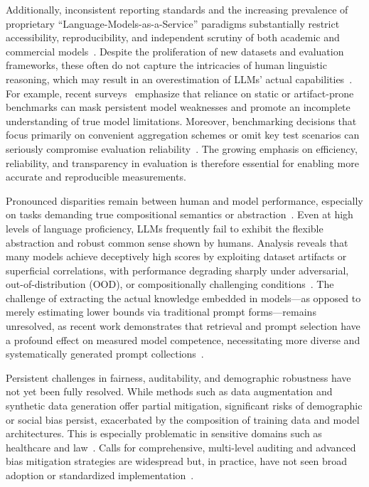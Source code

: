 \documentclass[sigconf]{acmart}
\begin{document}
Additionally, inconsistent reporting standards and the increasing prevalence of proprietary ``Language-Models-as-a-Service'' paradigms substantially restrict accessibility, reproducibility, and independent scrutiny of both academic and commercial models~\cite{ref7,ref13,ref34,ref47,ref52,ref106,ref107,ref108}. Despite the proliferation of new datasets and evaluation frameworks, these often do not capture the intricacies of human linguistic reasoning, which may result in an overestimation of LLMs' actual capabilities~\cite{ref44,ref77,ref79,ref98,ref99,ref102,ref103}. For example, recent surveys~\cite{ref10,ref55,ref56,ref44} emphasize that reliance on static or artifact-prone benchmarks can mask persistent model weaknesses and promote an incomplete understanding of true model limitations. Moreover, benchmarking decisions that focus primarily on convenient aggregation schemes or omit key test scenarios can seriously compromise evaluation reliability~\cite{ref104}. The growing emphasis on efficiency, reliability, and transparency in evaluation is therefore essential for enabling more accurate and reproducible measurements.

Pronounced disparities remain between human and model performance, especially on tasks demanding true compositional semantics or abstraction~\cite{ref31,ref32,ref44,ref96,ref98,ref99,ref97,ref92}. Even at high levels of language proficiency, LLMs frequently fail to exhibit the flexible abstraction and robust common sense shown by humans. Analysis reveals that many models achieve deceptively high scores by exploiting dataset artifacts or superficial correlations, with performance degrading sharply under adversarial, out-of-distribution (OOD), or compositionally challenging conditions~\cite{ref55,ref77,ref98}. The challenge of extracting the actual knowledge embedded in models---as opposed to merely estimating lower bounds via traditional prompt forms---remains unresolved, as recent work demonstrates that retrieval and prompt selection have a profound effect on measured model competence, necessitating more diverse and systematically generated prompt collections~\cite{ref98}.

Persistent challenges in fairness, auditability, and demographic robustness have not yet been fully resolved. While methods such as data augmentation and synthetic data generation offer partial mitigation, significant risks of demographic or social bias persist, exacerbated by the composition of training data and model architectures. This is especially problematic in sensitive domains such as healthcare and law~\cite{ref2,ref15,ref18,ref19,ref49,ref50,ref55,ref90,ref91}. Calls for comprehensive, multi-level auditing and advanced bias mitigation strategies are widespread but, in practice, have not seen broad adoption or standardized implementation~\cite{ref15,ref18,ref49,ref89,ref90}.
\end{document}
